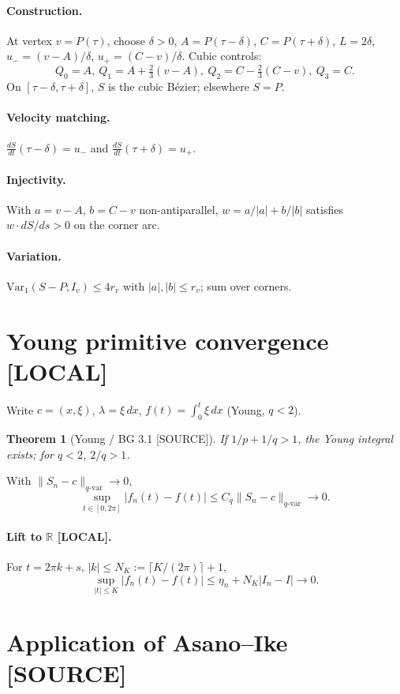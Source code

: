 \documentclass[11pt]{article}
\newtheorem{theorem}{Theorem}[section]
\theoremstyle{definition}
\theoremstyle{remark}
\newcommand{\tagsource}{\textsf{\footnotesize[SOURCE]}}
\newcommand{\taglocal}{\textsf{\footnotesize[LOCAL]}}
\begin{document}
\paragraph{Construction.}
At vertex $v=P(\tau)$, choose $\delta>0$, $A=P(\tau-\delta)$, $C=P(\tau+\delta)$,
$L=2\delta$, $u_-=(v-A)/\delta$, $u_+=(C-v)/\delta$.
Cubic controls:
\[
Q_0=A,\ Q_1=A+\tfrac23(v-A),\ Q_2=C-\tfrac23(C-v),\ Q_3=C.
\]
On $[\tau-\delta,\tau+\delta]$, $S$ is the cubic B\'ezier; elsewhere $S=P$.

\paragraph{Velocity matching.}
$\frac{dS}{dt}(\tau-\delta)=u_-$ and $\frac{dS}{dt}(\tau+\delta)=u_+$.

\paragraph{Injectivity.}
With $a=v-A$, $b=C-v$ non-antiparallel, $w=a/|a|+b/|b|$
satisfies $w\cdot dS/ds>0$ on the corner arc.

\paragraph{Variation.}
$\mathrm{Var}_1(S-P;I_v)\le 4r_v$ with $|a|,|b|\le r_v$; sum over corners.

\section{Young primitive convergence \taglocal}

Write $c=(x,\xi)$, $\lambda=\xi\,dx$, $f(t)=\int_0^t\xi\,dx$ (Young, $q<2$).

\begin{theorem}[Young / BG 3.1 \tagsource]
If $1/p+1/q>1$, the Young integral exists; for $q<2$, $2/q>1$.
\end{theorem}

With $\|S_n-c\|_{q\text{-var}}\to 0$,
\[
\sup_{t\in[0,2\pi]}|f_n(t)-f(t)|\le C_q\|S_n-c\|_{q\text{-var}}\to 0.
\]

\paragraph{Lift to $\mathbb{R}$ \taglocal.}
For $t=2\pi k+s$, $|k|\le N_K:=\lceil K/(2\pi)\rceil+1$,
\[
\sup_{|t|\le K}|f_n(t)-f(t)|\le \eta_n+N_K|I_n-I|\to 0.
\]

\section{Application of Asano--Ike \tagsource}
\end{document}

